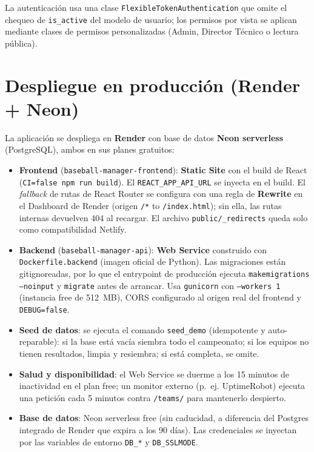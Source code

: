 \documentclass{report}
\begin{document}
    La autenticación usa una clase \texttt{FlexibleTokenAuthentication} que omite el chequeo de
    \texttt{is\_active} del modelo de usuario; los permisos por vista se aplican mediante clases de
    permisos personalizadas (Admin, Director Técnico o lectura pública).

    \section*{Despliegue en producción (Render + Neon)}
    La aplicación se despliega en \textbf{Render} con base de datos \textbf{Neon serverless}
    (PostgreSQL), ambos en sus planes gratuitos:

    \begin{itemize}
        \item \textbf{Frontend} (\texttt{baseball-manager-frontend}): \textbf{Static Site} con el build de
        React (\texttt{CI=false npm run build}). El \texttt{REACT\_APP\_API\_URL} se inyecta en el build.
        El \textit{fallback} de rutas de React Router se configura con una regla de \textbf{Rewrite} en el
        Dashboard de Render (origen \texttt{/*} to \texttt{/index.html}); sin ella, las rutas internas
        devuelven 404 al recargar. El archivo \texttt{public/\_redirects} queda solo como compatibilidad
        Netlify.
        \item \textbf{Backend} (\texttt{baseball-manager-api}): \textbf{Web Service} construido con
        \texttt{Dockerfile.backend} (imagen oficial de Python). Las migraciones están gitignoreadas, por lo
        que el entrypoint de producción ejecuta \texttt{makemigrations --noinput} y \texttt{migrate} antes
        de arrancar. Usa \texttt{gunicorn} con \texttt{--workers 1} (instancia free de 512~MB), CORS
        configurado al origen real del frontend y \texttt{DEBUG=false}.
        \item \textbf{Seed de datos}: se ejecuta el comando \texttt{seed\_demo} (idempotente y
        auto-reparable): si la base está vacía siembra todo el campeonato; si los equipos no tienen
        resultados, limpia y resiembra; si está completa, se omite.
        \item \textbf{Salud y disponibilidad}: el Web Service se duerme a los 15 minutos de inactividad en
        el plan free; un monitor externo (p.~ej. UptimeRobot) ejecuta una petición cada 5 minutos contra
        \texttt{/teams/} para mantenerlo despierto.
        \item \textbf{Base de datos}: Neon serverless free (sin caducidad, a diferencia del Postgres
        integrado de Render que expira a los 90 días). Las credenciales se inyectan por las variables de
        entorno \texttt{DB\_*} y \texttt{DB\_SSLMODE}.
    \end{itemize}
\end{document}

